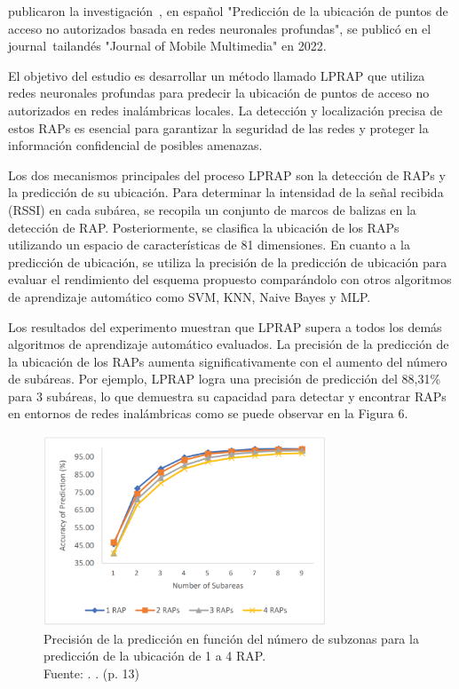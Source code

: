 \cite{pr_ketkhaw2019deepl}  publicaron la investigación , en español "Predicción de la ubicación de puntos de acceso no autorizados basada en redes neuronales profundas", se publicó en el journal tailandés "Journal of Mobile Multimedia" en 2022.

El objetivo del estudio es desarrollar un método llamado LPRAP que utiliza redes neuronales profundas para predecir la ubicación de puntos de acceso no autorizados en redes inalámbricas locales. La detección y localización precisa de estos RAPs es esencial para garantizar la seguridad de las redes y proteger la información confidencial de posibles amenazas.

Los dos mecanismos principales del proceso LPRAP son la detección de RAPs y la predicción de su ubicación. Para determinar la intensidad de la señal recibida (RSSI) en cada subárea, se recopila un conjunto de marcos de balizas en la detección de RAP. Posteriormente, se clasifica la ubicación de los RAPs utilizando un espacio de características de 81 dimensiones. En cuanto a la predicción de ubicación, se utiliza la precisión de la predicción de ubicación para evaluar el rendimiento del esquema propuesto comparándolo con otros algoritmos de aprendizaje automático como SVM, KNN, Naive Bayes y MLP.

Los resultados del experimento muestran que LPRAP supera a todos los demás algoritmos de aprendizaje automático evaluados. La precisión de la predicción de la ubicación de los RAPs aumenta significativamente con el aumento del número de subáreas. Por ejemplo, LPRAP logra una precisión de predicción del 88,31\% para 3 subáreas, lo que demuestra su capacidad para detectar y encontrar RAPs en entornos de redes inalámbricas como se puede observar en la Figura 6.

\begin{figure}[!ht]
	\begin{center}
		\includegraphics[width=0.75\textwidth]{2/figures/ketkha2022.png}
		\caption[Precisión de la predicción en función del número de subzonas para la predicción de la ubicación de 1 a 4 RAP.]{Precisión de la predicción en función del número de subzonas para la predicción de la ubicación de 1 a 4 RAP.\\
		Fuente: \cite{pr_ketkhaw2019deepl}. . (p. 13)}
		\label{2:fig114}
	\end{center}
\end{figure}

